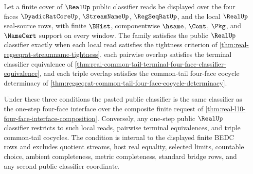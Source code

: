 \begin{theorem}
\label{thm:real-l10-four-face-classifier-sheaf-condition}
Let a finite cover of $\RealUp$ public classifier reads be displayed over the four faces $\DyadicRatCoreUp$, $\StreamNameUp$, $\RegSeqRatUp$, and the local $\RealUp$ seal-source rows, with finite $\BHist$, componentwise $\hsame$, $\Cont$, $\Pkg$, and $\NameCert$ support on every window. The family satisfies the public $\RealUp$ classifier exactly when each local read satisfies the tightness criterion of \autoref{thm:real-regseqrat-streamname-tightness}, each pairwise overlap satisfies the terminal classifier equivalence of \autoref{thm:real-common-tail-terminal-four-face-classifier-equivalence}, and each triple overlap satisfies the common-tail four-face cocycle determinacy of \autoref{thm:regseqrat-common-tail-four-face-cocycle-determinacy}.

Under these three conditions the pasted public classifier is the same classifier as the one-step four-face interface over the composite finite request of \autoref{thm:real-l10-four-face-interface-composition}. Conversely, any one-step public $\RealUp$ classifier restricts to such local reads, pairwise terminal equivalences, and triple common-tail cocycles. The condition is internal to the displayed finite BEDC rows and excludes quotient streams, host real equality, selected limits, countable choice, ambient completeness, metric completeness, standard bridge rows, and any second public classifier coordinate.
\end{theorem}
